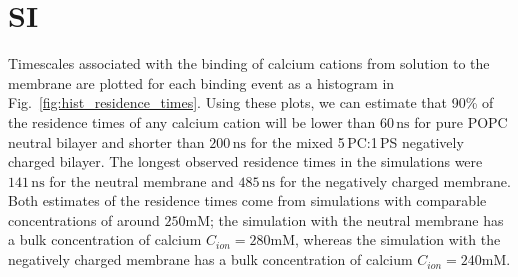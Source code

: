 \documentclass[journal=jpcbfk,manuscript=article]{achemso}
\begin{document}
\listoftodos



\section{SI}

Timescales associated with the binding of calcium cations from solution to the membrane
are plotted for each binding event as a histogram in Fig.~\ref{fig:hist_residence_times}. 
Using these plots, we can estimate that 90\% of the residence times of any calcium cation 
will be lower than $60\,\mathrm{ns}$ for pure POPC neutral bilayer 
and shorter than $200\,\mathrm{ns}$ for the mixed 5\,PC:1\,PS negatively charged bilayer. 
The longest observed residence times in the simulations were $141\,\mathrm{ns}$ for the neutral membrane 
and $485\,\mathrm{ns}$ for the negatively charged membrane. 
Both estimates of the residence times come from simulations with comparable concentrations of around $250\mathrm{mM}$;
the simulation with the neutral membrane has a bulk concentration of calcium $C_{ion} = 280\mathrm{mM}$, 
whereas the simulation with the negatively charged membrane has a bulk concentration of calcium $C_{ion} = 240\mathrm{mM}$. 
\end{document}
